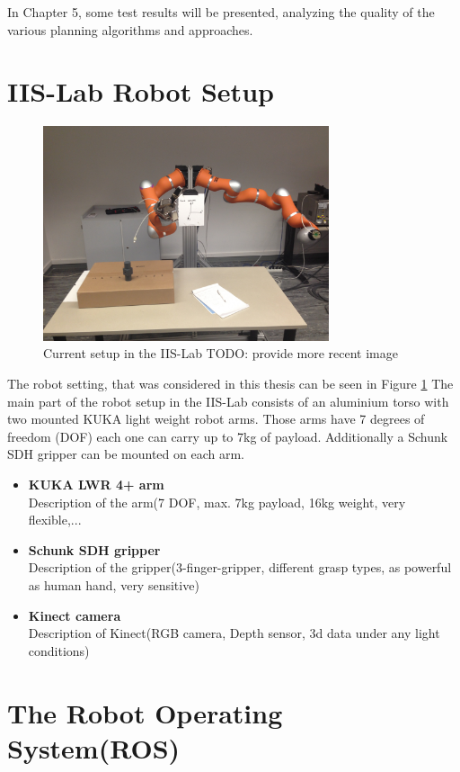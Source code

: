 In Chapter 5, some test results will be presented, analyzing the quality of the various planning algorithms and approaches.

\section{IIS-Lab Robot Setup}
\begin{figure}[ht]
	\centering
  \includegraphics[width=0.75\textwidth]{images/robot_setup.jpg}
	\caption{Current setup in the IIS-Lab TODO: provide more recent image}
	\label{fig:fig1}
\end{figure}

The robot setting, that was considered in this thesis can be seen in Figure \ref{fig:fig1}
The main part of the robot setup in the IIS-Lab consists of an aluminium torso with two mounted KUKA light weight robot arms. Those arms have 7 degrees of freedom (DOF) each one can carry up to 7kg of payload. Additionally a Schunk SDH gripper can be mounted on each arm.

\begin{itemize}
	\item \textbf{KUKA LWR 4+ arm}\\
		Description of the arm(7 DOF, max. 7kg payload, 16kg weight, very flexible,...
	\item \textbf{Schunk SDH gripper}\\
		Description of the gripper(3-finger-gripper, different grasp types, as powerful as human hand, very sensitive)
	\item \textbf{Kinect camera}\\
		Description of Kinect(RGB camera, Depth sensor, 3d data under any light conditions)
\end{itemize}


\section{The Robot Operating System(ROS)}

